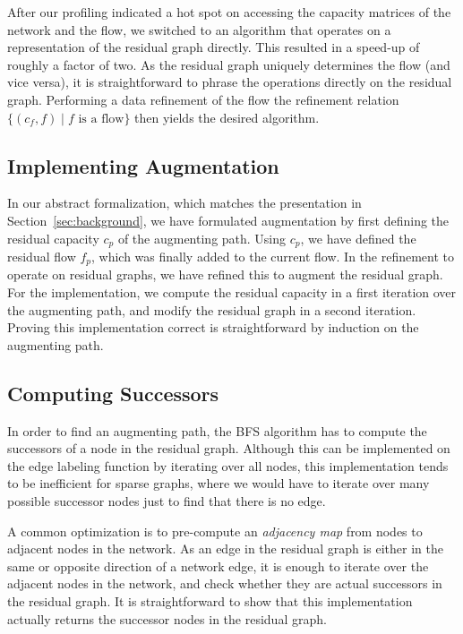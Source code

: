 \documentclass[smallcondensed]{svjour3}     %
\begin{document}
  After our profiling indicated a hot spot on accessing the capacity matrices of the network and the flow, we switched to 
  an algorithm that operates on a representation of the residual graph directly. This resulted in a speed-up of roughly a factor of two.
  As the residual graph uniquely determines the flow (and vice versa), it is straightforward to phrase the
  operations directly on the residual graph. Performing a data refinement of the flow \wrt the refinement 
  relation $\{(c_f,f) \mid \text{$f$ is a flow}\}$ then yields the desired algorithm.
      
  \subsection{Implementing Augmentation}    
  In our abstract formalization, which matches the presentation in Section~\ref{sec:background}, we have formulated augmentation by first defining 
  the residual capacity $c_p$ of the augmenting path. Using $c_p$, we have defined the residual flow $f_p$, which was finally added to the current flow.
  In the refinement to operate on residual graphs, we have refined this to augment the residual graph.
  For the implementation, we compute the residual capacity in a first iteration over the augmenting path, and modify the residual graph 
  in a second iteration. Proving this implementation correct is straightforward by induction on the augmenting path.
      
  \subsection{Computing Successors}
  In order to find an augmenting path, the BFS algorithm has to compute the successors of a node in the residual graph. 
  Although this can be implemented on the edge labeling function by iterating over all nodes, this implementation tends to be inefficient for sparse graphs,
  where we would have to iterate over many possible successor nodes just to find that there is no edge. 
  
  A common optimization is to pre-compute an \emph{adjacency map} from nodes to adjacent nodes in the network. 
  As an edge in the residual graph is either in the same or opposite direction of 
  a network edge, it is enough to iterate over the adjacent nodes in the network, and check whether they are actual successors in the residual graph.
  It is straightforward to show that this implementation actually returns the successor nodes in the residual graph.
\end{document}
